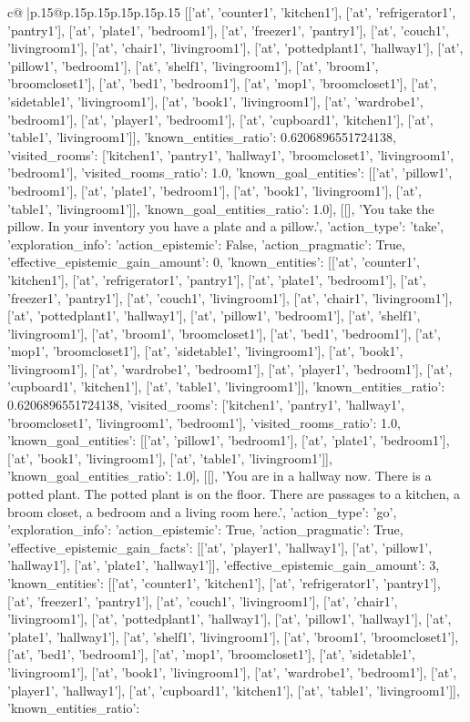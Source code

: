 \documentclass{article}
\begin{document}
{\begin{supertabular}{c@{$\;$}|p{.15\linewidth}@{}p{.15\linewidth}p{.15\linewidth}p{.15\linewidth}p{.15\linewidth}p{.15\linewidth}}
{{{[['at', 'counter1', 'kitchen1'], ['at', 'refrigerator1', 'pantry1'], ['at', 'plate1', 'bedroom1'], ['at', 'freezer1', 'pantry1'], ['at', 'couch1', 'livingroom1'], ['at', 'chair1', 'livingroom1'], ['at', 'pottedplant1', 'hallway1'], ['at', 'pillow1', 'bedroom1'], ['at', 'shelf1', 'livingroom1'], ['at', 'broom1', 'broomcloset1'], ['at', 'bed1', 'bedroom1'], ['at', 'mop1', 'broomcloset1'], ['at', 'sidetable1', 'livingroom1'], ['at', 'book1', 'livingroom1'], ['at', 'wardrobe1', 'bedroom1'], ['at', 'player1', 'bedroom1'], ['at', 'cupboard1', 'kitchen1'], ['at', 'table1', 'livingroom1']], 'known_entities_ratio': 0.6206896551724138, 'visited_rooms': ['kitchen1', 'pantry1', 'hallway1', 'broomcloset1', 'livingroom1', 'bedroom1'], 'visited_rooms_ratio': 1.0, 'known_goal_entities': [['at', 'pillow1', 'bedroom1'], ['at', 'plate1', 'bedroom1'], ['at', 'book1', 'livingroom1'], ['at', 'table1', 'livingroom1']], 'known_goal_entities_ratio': 1.0}}], [[], 'You take the pillow. In your inventory you have a plate and a pillow.', {'action_type': 'take', 'exploration_info': {'action_epistemic': False, 'action_pragmatic': True, 'effective_epistemic_gain_amount': 0, 'known_entities': [['at', 'counter1', 'kitchen1'], ['at', 'refrigerator1', 'pantry1'], ['at', 'plate1', 'bedroom1'], ['at', 'freezer1', 'pantry1'], ['at', 'couch1', 'livingroom1'], ['at', 'chair1', 'livingroom1'], ['at', 'pottedplant1', 'hallway1'], ['at', 'pillow1', 'bedroom1'], ['at', 'shelf1', 'livingroom1'], ['at', 'broom1', 'broomcloset1'], ['at', 'bed1', 'bedroom1'], ['at', 'mop1', 'broomcloset1'], ['at', 'sidetable1', 'livingroom1'], ['at', 'book1', 'livingroom1'], ['at', 'wardrobe1', 'bedroom1'], ['at', 'player1', 'bedroom1'], ['at', 'cupboard1', 'kitchen1'], ['at', 'table1', 'livingroom1']], 'known_entities_ratio': 0.6206896551724138, 'visited_rooms': ['kitchen1', 'pantry1', 'hallway1', 'broomcloset1', 'livingroom1', 'bedroom1'], 'visited_rooms_ratio': 1.0, 'known_goal_entities': [['at', 'pillow1', 'bedroom1'], ['at', 'plate1', 'bedroom1'], ['at', 'book1', 'livingroom1'], ['at', 'table1', 'livingroom1']], 'known_goal_entities_ratio': 1.0}}], [[], 'You are in a hallway now. There is a potted plant. The potted plant is on the floor. There are passages to a kitchen, a broom closet, a bedroom and a living room here.', {'action_type': 'go', 'exploration_info': {'action_epistemic': True, 'action_pragmatic': True, 'effective_epistemic_gain_facts': [['at', 'player1', 'hallway1'], ['at', 'pillow1', 'hallway1'], ['at', 'plate1', 'hallway1']], 'effective_epistemic_gain_amount': 3, 'known_entities': [['at', 'counter1', 'kitchen1'], ['at', 'refrigerator1', 'pantry1'], ['at', 'freezer1', 'pantry1'], ['at', 'couch1', 'livingroom1'], ['at', 'chair1', 'livingroom1'], ['at', 'pottedplant1', 'hallway1'], ['at', 'pillow1', 'hallway1'], ['at', 'plate1', 'hallway1'], ['at', 'shelf1', 'livingroom1'], ['at', 'broom1', 'broomcloset1'], ['at', 'bed1', 'bedroom1'], ['at', 'mop1', 'broomcloset1'], ['at', 'sidetable1', 'livingroom1'], ['at', 'book1', 'livingroom1'], ['at', 'wardrobe1', 'bedroom1'], ['at', 'player1', 'hallway1'], ['at', 'cupboard1', 'kitchen1'], ['at', 'table1', 'livingroom1']], 'known_entities_ratio': }}}
\end{supertabular}}
\end{document}
